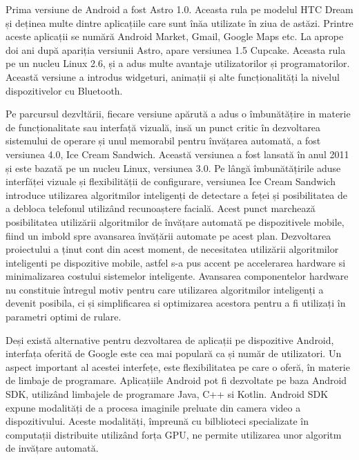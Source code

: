 	Prima versiune de Android a fost Astro 1.0. Aceasta rula pe modelul HTC Dream și deținea multe dintre aplicațiile care sunt înăa utilizate în ziua de astăzi. Printre aceste aplicații se numără Android Market, Gmail, Google Maps etc.
	La aprope doi ani după apariția versiunii Astro, apare versiunea 1.5 Cupcake. Aceasta rula pe un nucleu Linux 2.6, și a adus multe avantaje utilizatorilor și programatorilor. Această versiune a introdus widgeturi, animații și alte funcționalități la nivelul dispozitivelor cu Bluetooth.
	\newline
	
	Pe parcursul dezvltării, fiecare versiune apărută a adus o îmbunătățire in materie de funcționalitate sau interfață vizuală, insă un punct critic în dezvoltarea sistemului de operare și unul memorabil pentru învățarea automată, a fost versiunea 4.0, Ice Cream Sandwich. Această versiunea a fost lansată în anul 2011 și este bazată pe un nucleu Linux, versiunea 3.0. Pe lângă îmbunătățirile aduse interfăței vizuale și flexibilității de configurare, versiunea Ice Cream Sandwich introduce utilizarea algoritmilor inteligenți de detectare a feței și posibilitatea de a debloca telefonul utilizând recunoaștere facială. 	
	Acest punct marchează posibilitatea utilizării algoritmilor de învățare automată pe dispozitivele mobile, fiind un imbold spre avansarea învățării automate pe acest plan. Dezvoltarea proiectului a ținut cont din acest moment, de necesitatea utilizării algoritmilor inteligenti pe dispozitive mobile, astfel s-a pus accent pe accelerarea hardware si minimalizarea costului sistemelor inteligente. Avansarea componentelor hardware nu constituie întregul motiv pentru care utilizarea algoritmilor inteligenți a devenit posibila, ci și simplificarea si optimizarea acestora pentru a fi utilizați în parametri optimi de rulare.
	\newline
	
	Deși există alternative pentru dezvoltarea de aplicații pe dispozitive Android, interfața oferită de Google este cea mai populară ca și număr de utilizatori. Un aspect important al acestei interfețe, este flexibilitatea pe care o oferă, în materie de limbaje de programare. Aplicațiile Android pot fi dezvoltate pe baza Android SDK, utilizând limbajele de programare Java, C++ si Kotlin. \cite{android}	
	Android SDK expune modalități de a procesa imaginile preluate din camera video a dispozitivului. Aceste modalități, împreună cu bilblioteci specializate în computații distribuite utilizând forța GPU, ne permite utilizarea unor algoritm de invățare automată. 
	
	
	
